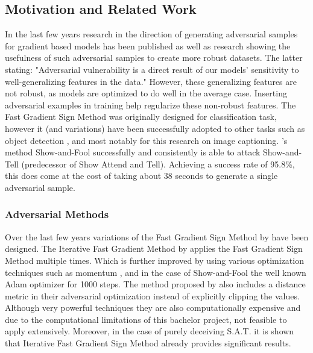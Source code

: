 \subsection{Motivation and Related Work}
In the last few years research in the direction of generating adversarial samples for gradient based models has been published \cite{goodfellow2015explaining,Kurakin} as well as research showing the usefulness of such adversarial samples\cite{Ilyas2019features} to create more robust datasets. The latter stating: "Adversarial vulnerability is a direct result of our models' sensitivity to well-generalizing features in the data." However, these generalizing features are not robust, as models are optimized to do well in the average case. Inserting adversarial examples in training help regularize these non-robust features\cite{https://doi.org/10.48550/arxiv.1611.01236}. The Fast Gradient Sign Method was originally designed for classification task, however it (and variations) have been successfully adopted to other tasks such as object detection \cite{AdversarialAttacksOnFace,AdversarialFasterRCNN,DBLP:journals/corr/abs-1907-10310}, and most notably for this research on image captioning\cite{Hongge}. \citeauthor{Hongge}'s method Show-and-Fool successfully and consistently is able to attack Show-and-Tell\cite{showandtell} (predecessor of Show Attend and Tell). Achieving a success rate of 95.8\%, this does come at the cost of taking about 38 seconds to generate a single adversarial sample.

\subsubsection*{Adversarial Methods}
Over the last few years variations of the Fast Gradient Sign Method by \cite{goodfellow2015explaining} have been designed. The Iterative Fast Gradient Method by \citeauthor{Kurakin} applies the Fast Gradient Sign Method multiple times. Which is further improved by using various optimization techniques such as momentum \cite{9237700}, and in the case of Show-and-Fool the well known Adam\cite{kingma2017adam} optimizer for 1000 steps. The method proposed by \citeauthor{EvaluatingRobustness} also includes a distance metric in their adversarial optimization instead of explicitly clipping the values. Although very powerful techniques they are also computationally expensive and due to the computational limitations of this bachelor project, not feasible to apply extensively. Moreover, in the case of purely deceiving S.A.T. it is shown that Iterative Fast Gradient Sign Method already provides significant results.

